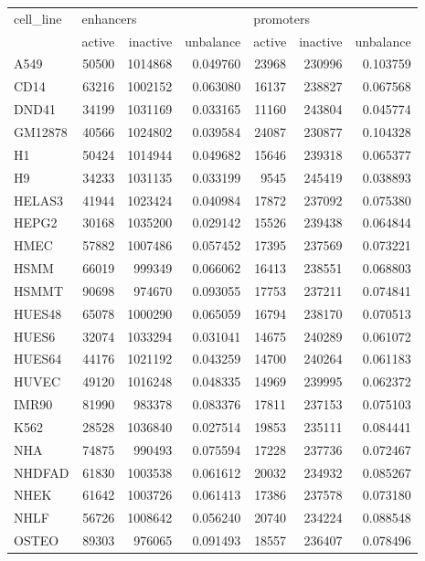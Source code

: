 \begin{tabular}{lrrrrrr}
\toprule
cell\_line & \multicolumn{3}{l}{enhancers} & \multicolumn{3}{l}{promoters} \\
          &    active & inactive & unbalance &    active & inactive & unbalance \\
\midrule
     A549 &     50500 &  1014868 &  0.049760 &     23968 &   230996 &  0.103759 \\
     CD14 &     63216 &  1002152 &  0.063080 &     16137 &   238827 &  0.067568 \\
    DND41 &     34199 &  1031169 &  0.033165 &     11160 &   243804 &  0.045774 \\
  GM12878 &     40566 &  1024802 &  0.039584 &     24087 &   230877 &  0.104328 \\
       H1 &     50424 &  1014944 &  0.049682 &     15646 &   239318 &  0.065377 \\
       H9 &     34233 &  1031135 &  0.033199 &      9545 &   245419 &  0.038893 \\
   HELAS3 &     41944 &  1023424 &  0.040984 &     17872 &   237092 &  0.075380 \\
    HEPG2 &     30168 &  1035200 &  0.029142 &     15526 &   239438 &  0.064844 \\
     HMEC &     57882 &  1007486 &  0.057452 &     17395 &   237569 &  0.073221 \\
     HSMM &     66019 &   999349 &  0.066062 &     16413 &   238551 &  0.068803 \\
    HSMMT &     90698 &   974670 &  0.093055 &     17753 &   237211 &  0.074841 \\
   HUES48 &     65078 &  1000290 &  0.065059 &     16794 &   238170 &  0.070513 \\
    HUES6 &     32074 &  1033294 &  0.031041 &     14675 &   240289 &  0.061072 \\
   HUES64 &     44176 &  1021192 &  0.043259 &     14700 &   240264 &  0.061183 \\
    HUVEC &     49120 &  1016248 &  0.048335 &     14969 &   239995 &  0.062372 \\
    IMR90 &     81990 &   983378 &  0.083376 &     17811 &   237153 &  0.075103 \\
     K562 &     28528 &  1036840 &  0.027514 &     19853 &   235111 &  0.084441 \\
      NHA &     74875 &   990493 &  0.075594 &     17228 &   237736 &  0.072467 \\
   NHDFAD &     61830 &  1003538 &  0.061612 &     20032 &   234932 &  0.085267 \\
     NHEK &     61642 &  1003726 &  0.061413 &     17386 &   237578 &  0.073180 \\
     NHLF &     56726 &  1008642 &  0.056240 &     20740 &   234224 &  0.088548 \\
    OSTEO &     89303 &   976065 &  0.091493 &     18557 &   236407 &  0.078496 \\
\bottomrule
\end{tabular}
